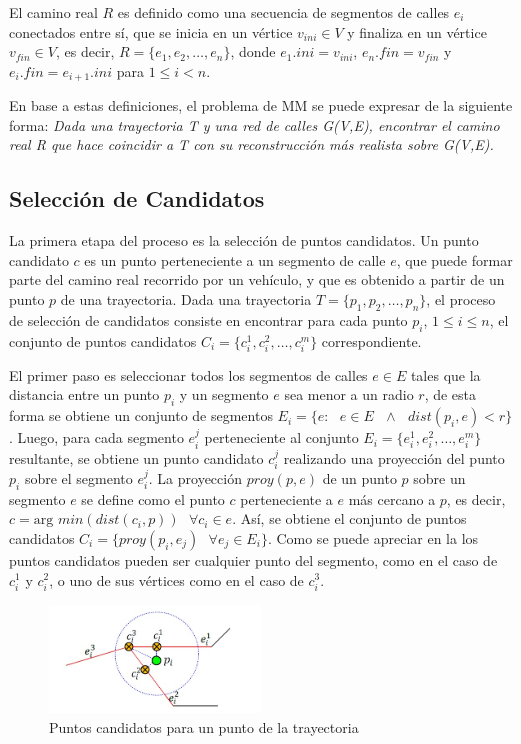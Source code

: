 El camino real $R$ es definido como una secuencia de segmentos de calles $e_i$ conectados entre sí, que se inicia en un vértice $v_{ini} \in V$ y finaliza en un vértice $v_{fin} \in V$, es decir, $R = \{ e_1, e_2, \dots, e_n \}$, donde $e_1.ini = v_{ini}$, $e_n.fin = v_{fin}$ y $e_i.fin = e_{i + 1}.ini$ para $1 \le i < n$.

En base a estas definiciones, el problema de MM se puede expresar de la siguiente forma: \emph{Dada una trayectoria T y una red de calles G(V,E), encontrar el camino real R que hace coincidir a T con su reconstrucción más realista sobre G(V,E).}

\subsection{Selección de Candidatos}

La primera etapa del proceso es la selección de puntos candidatos. Un punto candidato $c$ es un punto perteneciente a un segmento de calle $e$, que puede formar parte del camino real recorrido por un vehículo, y que es obtenido a partir de un punto $p$ de una trayectoria. Dada una trayectoria $T = \{p_1, p_2, \dots, p_n\}$, el proceso de selección de candidatos consiste en encontrar para cada punto $p_i$, $1\le i\le n$, el conjunto de puntos candidatos $C_i = \{c_{i}^{1}, c_{i}^{2}, \dots, c_{i}^{m}\}$ correspondiente.

El primer paso es seleccionar todos los segmentos de calles $e \in E$ tales que la distancia entre un punto $p_i$ y un segmento $e$ sea menor a un radio $r$, de esta forma se obtiene un conjunto de segmentos $E_i = \{ e : \text{ } e \in E \text{ } \wedge \text{ } dist(p_i, e) < r \}$. Luego, para cada segmento $e_{i}^{j}$ perteneciente al conjunto $E_i = \{e_{i}^{1}, e_{i}^{2}, \dots, e_{i}^{m}\}$ resultante, se obtiene un punto candidato $c_{i}^{j}$ realizando una proyección del punto $p_i$ sobre el segmento $e_{i}^{j}$. La proyección $proy(p, e)$ de un punto $p$ sobre un segmento $e$ se define como el punto $c$ perteneciente a $e$ más cercano a $p$, es decir, $c = \text{arg } min(dist(c_i, p)) \text{ } \forall c_i \in e$. Así, se obtiene el conjunto de puntos candidatos $C_i = \{ proy(p_i, e_j) \text{ } \forall e_j \in E_i \}$. Como se puede apreciar en la  los puntos candidatos pueden ser cualquier punto del segmento, como en el caso de $c_{i}^{1}$ y $c_{i}^{2}$, o uno de sus vértices como en el caso de $c_{i}^{3}$.

\begin{figure}[h*]
	\centering
	\includegraphics[width=0.5\textwidth]{capitulos/6/figuras/figura6.jpg}
	\caption{\label{fig:puntos_candidatos} Puntos candidatos para un punto de la trayectoria}	
\end{figure}

